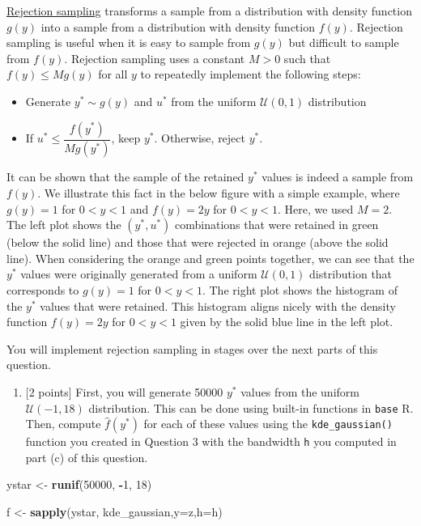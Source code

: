 \documentclass[
]{article}
\newenvironment{Shaded}{\begin{snugshade}}{\end{snugshade}}
\newcommand{\AttributeTok}[1]{\textcolor[rgb]{0.13,0.29,0.53}{#1}}
\newcommand{\DecValTok}[1]{\textcolor[rgb]{0.00,0.00,0.81}{#1}}
\newcommand{\FunctionTok}[1]{\textcolor[rgb]{0.13,0.29,0.53}{\textbf{#1}}}
\newcommand{\NormalTok}[1]{#1}
\newcommand{\OtherTok}[1]{\textcolor[rgb]{0.56,0.35,0.01}{#1}}
\newcommand{\SpecialCharTok}[1]{\textcolor[rgb]{0.81,0.36,0.00}{\textbf{#1}}}
\providecommand{\tightlist}{%
  \setlength{\itemsep}{0pt}\setlength{\parskip}{0pt}}
\begin{document}
\href{https://en.wikipedia.org/wiki/Rejection_sampling}{Rejection
sampling} transforms a sample from a distribution with density function
\(g(y)\) into a sample from a distribution with density function
\(f(y)\). Rejection sampling is useful when it is easy to sample from
\(g(y)\) but difficult to sample from \(f(y)\). Rejection sampling uses
a constant \(M > 0\) such that \(f(y) \le Mg(y)\) for all \(y\) to
repeatedly implement the following steps:

\begin{itemize}
\item
  Generate \(y^* \sim g(y)\) and \(u^*\) from the uniform
  \(\mathcal{U}(0,1)\) distribution
\item
  If \(u^* \le \dfrac{f(y^*)}{Mg(y^*)}\), keep \(y^*\). Otherwise,
  reject \(y^*\).
\end{itemize}

It can be shown that the sample of the retained \(y^*\) values is indeed
a sample from \(f(y)\). We illustrate this fact in the below figure with
a simple example, where \(g(y) = 1\) for \(0 < y < 1\) and \(f(y) = 2y\)
for \(0 < y < 1\). Here, we used \(M = 2\). The left plot shows the
\((y^*, u^*)\) combinations that were retained in green (below the solid
line) and those that were rejected in orange (above the solid line).
When considering the orange and green points together, we can see that
the \(y^*\) values were originally generated from a uniform
\(\mathcal{U}(0,1)\) distribution that corresponds to \(g(y) = 1\) for
\(0 < y < 1\). The right plot shows the histogram of the \(y^*\) values
that were retained. This histogram aligns nicely with the density
function \(f(y) = 2y\) for \(0 < y < 1\) given by the solid blue line in
the left plot.

You will implement rejection sampling in stages over the next parts of
this question.

\begin{enumerate}
\def\labelenumi{(\alph{enumi})}
\setcounter{enumi}{3}
\tightlist
\item
  {[}2 points{]} First, you will generate 50000 \(y^*\) values from the
  uniform \(\mathcal{U}(-1,18)\) distribution. This can be done using
  built-in functions in \texttt{base} R. Then, compute \(\hat{f}(y^*)\)
  for each of these values using the \texttt{kde\_gaussian()} function
  you created in Question 3 with the bandwidth \texttt{h} you computed
  in part (c) of this question.
\end{enumerate}

\begin{Shaded}
\begin{Highlighting}[]
\NormalTok{ystar }\OtherTok{\textless{}{-}} \FunctionTok{runif}\NormalTok{(}\DecValTok{50000}\NormalTok{, }\SpecialCharTok{{-}}\DecValTok{1}\NormalTok{, }\DecValTok{18}\NormalTok{)}

\NormalTok{f }\OtherTok{\textless{}{-}} \FunctionTok{sapply}\NormalTok{(ystar, kde\_gaussian,}\AttributeTok{y=}\NormalTok{z,}\AttributeTok{h=}\NormalTok{h)}
\end{Highlighting}
\end{Shaded}
\end{document}
